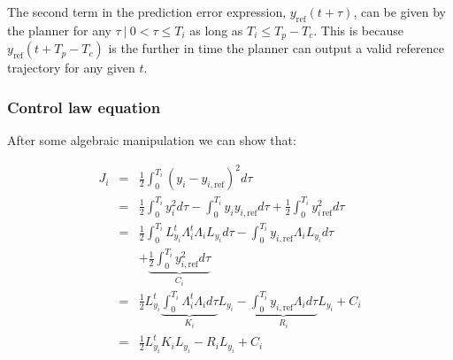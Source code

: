 \documentclass[letterpaper, 10 pt, conference]{ieeeconf}  %
\begin{document}

The second term in the prediction error expression, ${y_{\text{ref}}(t+\tau)}$, 
can be given by the planner for any ${\tau\ |\ 0 < \tau \leq T_i}$ as long as ${T_i \leq T_p - T_c}$. This is because $y_{\text{ref}}(t + T_p - T_c)$ is the further in time the planner can output a valid reference trajectory for any given $t$.



\subsubsection{Control law equation}

\mbox{}

After some algebraic manipulation we can show that:

\begin{eqnarray*}
J_i &=& \frac{1}{2}\int_0^{T_i}(y_i - y_{i,\text{ref}})^2d\tau\\
&=& \frac{1}{2}\int_0^{T_i}y_i^2d\tau -\int_0^{T_i}y_iy_{i,\text{ref}}d\tau + \frac{1}{2}\int_0^{T_i}y_{i\,\text{ref}}^2d\tau\\
&=& \frac{1}{2}\int_0^{T_i}L_{y_i}^t\Lambda_i^t\Lambda_iL_{y_i}d\tau - \int_0^{T_i}y_{i,\text{ref}}\Lambda_iL_{y_i}d\tau\\
&& + \underbrace{\frac{1}{2}\int_0^{T_i}y_{i,\text{ref}}^2d\tau}_{C_i}\\
&=& \frac{1}{2}L_{y_i}^t\underbrace{\int_0^{T_i}\Lambda_i^t\Lambda_id\tau}_{K_i} L_{y_i} -\underbrace{\int_0^{T_i}y_{i,\text{ref}}\Lambda_id\tau}_{R_i}L_{y_i} + C_i\\
&=& \frac{1}{2}L_{y_i}^tK_iL_{y_i} -R_iL_{y_i} + C_i
\end{eqnarray*}
\end{document}
